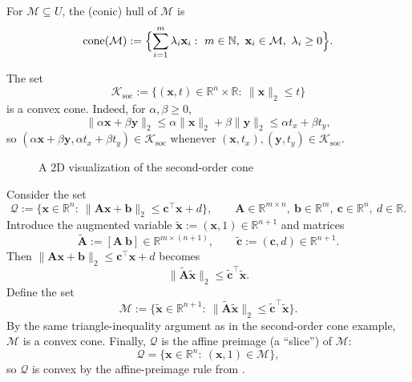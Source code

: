 \begin{definition}
For $\mathcal{M}\subseteq U$, the (conic) hull of $\mathcal{M}$ is
\[
  \operatorname{cone}(\mathcal{M})
  :=\Bigl\{\sum_{i=1}^m \lambda_i \mathbf{x}_i:\ m\in\mathbb{N},\ \mathbf{x}_i\in\mathcal{M},\ \lambda_i\ge 0\Bigr\}.
\]
\end{definition}

\begin{example}
The set
\[
  \mathcal{K}_{\mathrm{soc}}
  :=\{(\mathbf{x},t)\in\mathbb{R}^n\times \mathbb{R}:\ \|\mathbf{x}\|_2\le t\}
\]
is a convex cone. Indeed, for $\alpha,\beta\ge 0$,
\[
  \|\alpha\mathbf{x}+\beta\mathbf{y}\|_2
  \le \alpha\|\mathbf{x}\|_2+\beta\|\mathbf{y}\|_2
  \le \alpha t_x+\beta t_y,
\]
so $(\alpha\mathbf{x}+\beta\mathbf{y},\alpha t_x+\beta t_y)\in\mathcal{K}_{\mathrm{soc}}$ whenever
$(\mathbf{x},t_x),(\mathbf{y},t_y)\in\mathcal{K}_{\mathrm{soc}}$.
\end{example}

\begin{figure}[ht]
    \centering
    \caption{A 2D visualization of the second-order cone}
    \label{fig:soc}
\end{figure}

\begin{example}
Consider the set
\[
  \mathcal{Q}:=\{\mathbf{x}\in\mathbb{R}^n:\ \|\mathbf{A}\mathbf{x}+\mathbf{b}\|_2\le \mathbf{c}^\top \mathbf{x}+d\},
  \qquad
  \mathbf{A}\in\mathbb{R}^{m\times n},\ \mathbf{b}\in\mathbb{R}^m,\ \mathbf{c}\in\mathbb{R}^n,\ d\in\mathbb{R}.
\]
Introduce the augmented variable $\tilde{\mathbf{x}}:=(\mathbf{x},1)\in\mathbb{R}^{n+1}$ and matrices
\[
  \tilde{\mathbf{A}}:=[\mathbf{A}\ \mathbf{b}]\in\mathbb{R}^{m\times (n+1)},
  \qquad
  \tilde{\mathbf{c}}:=(\mathbf{c},d)\in\mathbb{R}^{n+1}.
\]
Then $\|\mathbf{A}\mathbf{x}+\mathbf{b}\|_2\le \mathbf{c}^\top \mathbf{x}+d$ becomes
\[
  \|\tilde{\mathbf{A}}\tilde{\mathbf{x}}\|_2\le \tilde{\mathbf{c}}^\top \tilde{\mathbf{x}}.
\]
Define the set
\[
  \mathcal{M}:=\{\tilde{\mathbf{x}}\in\mathbb{R}^{n+1}:\ \|\tilde{\mathbf{A}}\tilde{\mathbf{x}}\|_2\le \tilde{\mathbf{c}}^\top \tilde{\mathbf{x}}\}.
\]
By the same triangle-inequality argument as in the second-order cone example, $\mathcal{M}$ is a convex cone.
Finally, $\mathcal{Q}$ is the affine preimage (a ``slice'') of $\mathcal{M}$:
\[
  \mathcal{Q}=\{\mathbf{x}\in\mathbb{R}^n:\ (\mathbf{x},1)\in \mathcal{M}\},
\]
so $\mathcal{Q}$ is convex by the affine-preimage rule from .
\end{example}


